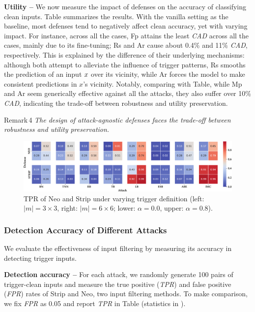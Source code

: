 \documentclass[compsoc,conference,a4paper,10pt,times]{IEEEtran}
\newcommand{\cad}{{\em \small CAD}\xspace}
\newcommand{\tpr}{{\em \small TPR}\xspace}
\newcommand{\fpr}{{\em \small FPR}\xspace}
\newcommand{\strip}{{\sc Strip}\xspace}
\newcommand{\fp}{{\sc Fp}\xspace}
\newcommand{\at}{{\sc Ar}\xspace}
\newcommand{\rands}{{\sc Rs}\xspace}
\newcommand{\neo}{{\sc Neo}\xspace}
\newcommand{\mmp}{{\sc Mp}\xspace}
\begin{document}
\vspace{2pt}
{\bf Utility --} We now measure the impact of defenses on the accuracy of classifying clean inputs. Table summarizes the results. With the vanilla setting as the baseline, most defenses tend to negatively affect clean accuracy, yet with varying impact. For instance, across all the cases, \fp attains the least \cad across all the cases, mainly due to its fine-tuning; \rands and \at cause about 0.4\% and 11\% \cad, respectively. This is explained by the difference of their underlying mechanisms: although both attempt to alleviate the influence of trigger patterns, \rands smooths the prediction of an input $x$ over its vicinity, while \at forces the model to make consistent predictions in $x$'s vicinity. Notably, comparing with Table, while \mmp and \at seem generically effective against all the attacks, they also suffer over 10\% \cad, indicating the trade-off between robustness and utility preservation.
\begin{mtbox}{\small Remark\,4}
{\em \small The design of attack-agnostic defenses faces the trade-off between robustness and utility preservation.}
\end{mtbox}




\begin{figure}[!ht]
    \centering
    \includegraphics[width=140mm]{figures/defense/defense-trigger-inference.pdf}
    \caption{TPR of \neo and \strip under varying trigger definition (left:  $|m|=3\times3$, right:  $|m|=6\times6$; lower:  $\alpha=0.0$, upper:  $\alpha=0.8$). \label{fig:inference-trigger}}
\end{figure}

\subsubsection{Detection Accuracy of Different Attacks}
\label{sec:attack-defense-eval}
We evaluate the effectiveness of input filtering by measuring its accuracy in detecting trigger inputs. 

\vspace{2pt}
{\bf Detection accuracy --} For each attack, we randomly generate 100 pairs of trigger-clean inputs and measure the true positive (\tpr) and false positive (\fpr) rates of \strip and \neo, two input filtering methods. To make comparison, we fix \fpr as 0.05 and report \tpr in Table (statistics in ).
\end{document}
